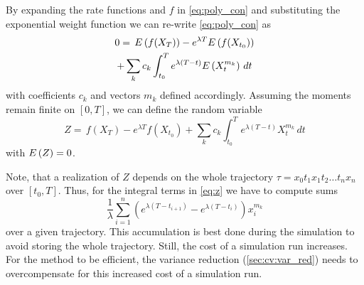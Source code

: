 By expanding the rate functions and $f$ in \eqref{eq:poly_con} and substituting the
exponential weight function we can re-write \eqref{eq:poly_con} as
\begin{multline}\label{eq:simpl_exp}
        0 =\,
         {E}\left(f(X_{T})\right)
        - e^{\lambda T}{E}\left(f(X_{t_0})\right)\\
        + \sum_{k}c_k\int_{t_0}^{T}e^{\lambda(T-t)}{E}\left(X_t^{m_k}\right)\,dt
\end{multline}
with coefficients $c_k$ and vectors $m_k$ defined accordingly.
Assuming the moments remain finite on $[0,T]$, we can define the random variable
\begin{equation}\label{eq:z}
        Z =\,
         f(X_{T})
        - e^{\lambda T}f(X_{t_0})
        + \sum_{k}c_k\int_{t_0}^{T}e^{\lambda(T-t)}X_t^{m_k}\,dt
\end{equation}
with ${E}\left(Z\right)=0$.

Note, that a realization of $Z$ depends on the whole trajectory $\tau=x_0t_1 x_1 t_2 \dots\allowbreak t_n x_n$ over $[t_0,T]$.
Thus, for the integral terms
in \eqref{eq:z} we have to compute sums
\begin{equation}\label{eq:dis_int}
    \frac{1}{\lambda}\sum_{i=1}^n\left(e^{\lambda(T - t_{i+1})}
    - e^{\lambda(T-t_i)}\right)x_i^{m_k}
\end{equation}
over a given trajectory.
This accumulation is best done during the simulation to avoid storing the whole trajectory.
Still, the cost of a simulation run increases.
For the method to be efficient, the variance reduction (\autoref{sec:cv:var_red}) needs
to overcompensate for this increased cost of a simulation run.

